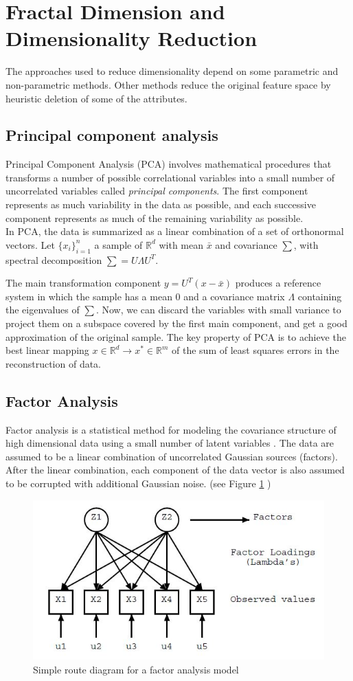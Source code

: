 \documentclass{article}
\begin{document}
\section{Fractal Dimension and Dimensionality Reduction}
The approaches used to reduce dimensionality depend on some parametric and non-parametric methods. Other methods reduce the original feature space by heuristic deletion of some of the attributes.

\subsection{Principal component analysis}
Principal Component Analysis (PCA) involves mathematical procedures that transforms a number of possible correlational variables into a small number of uncorrelated variables called \textit{principal components}. The first component represents as much variability in the data as possible, and each successive component represents as much of the remaining variability as possible. \\

In PCA, the data is summarized as a linear combination of a set of orthonormal vectors. Let $\{ x_i \}_{i=1}^n$  a sample of $ \mathbb{R}^d $  with mean $\bar{x}$  and covariance $ \sum $, with spectral decomposition $ \sum = U \Lambda U^T $.

The main transformation component $y= U^T(x-\bar{x})$  produces a reference system in which the sample has a mean $ 0 $ and a covariance matrix $\Lambda$ containing the eigenvalues of $\sum$. Now, we can discard the variables with small variance to project them on a subspace covered by the first main component, and get a good approximation of the original sample. The key property of PCA is to achieve the best linear mapping $x \in \mathbb{R}^d \rightarrow x^* \in \mathbb{R}^m$ of the sum of least squares errors in the reconstruction of data.

\subsection{Factor Analysis}
Factor analysis is a statistical method for modeling the covariance structure of high dimensional data using a small number of latent variables \cite{Ghahramani}. The data are assumed to be a linear combination of uncorrelated Gaussian sources (factors). After the linear combination, each component of the data vector is also assumed to be corrupted with additional Gaussian noise. (see Figure \ref{fig:fig_1} )
\begin{figure}[htp]\centering
\includegraphics[width=0.6\columnwidth]{images_fractal/frac_1.JPG}
\caption{ Simple route diagram for a factor analysis model }
\label{fig:fig_1}
\end{figure}
\end{document}
